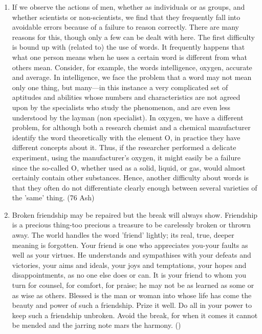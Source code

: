 \documentclass[12pt]{article}
\begin{document}
\begin{enumerate}
    \item If we observe the actions of men, whether as individuals or as groups, and whether scientists or non-scientists, we find that they frequently fall into avoidable errors because of a failure to reason correctly. There are many reasons for this, though only a few can be dealt with here.
      The first difficulty is bound up with (related to) the use of words. It frequently happens that what one person means when he uses a certain word is different from what others mean. Consider, for example, the words intelligence, oxygen, accurate and average. In intelligence, we face the problem that a word may not mean only one thing, but many—in this instance a very complicated set of aptitudes and abilities whose numbers and characteristics are not agreed upon by the specialists who study the phenomenon, and are even less understood by the layman (non specialist). In oxygen, we have a different problem, for although both a research chemist and a chemical manufacturer identify the word theoretically with the element O, in practice they have different concepts about it. Thus, if the researcher performed a delicate experiment, using the manufacturer's oxygen, it might easily be a failure since the so-called O, whether used as a solid, liquid, or gas, would almost certainly contain other substances. Hence, another difficulty about words is that they often do not differentiate clearly enough between several varieties of the 'same' thing. \hfill (76 Ash)

    \item Broken friendship may be repaired but the break will always show. Friendship is a precious thing-too precious a treasure to be carelessly broken or thrown away. The world handles the word 'friend' lightly; its real, true, deeper meaning is forgotten.
      Your friend is one who appreciates you-your faults as well as your virtues. He understands and sympathises with your defeats and victories, your aims and ideals, your joys and temptations, your hopes and disappointments, as no one else does or can. It is your friend to whom you turn for counsel, for comfort, for praise; he may not be as learned as some or as wise as others.
      Blessed is the man or woman into whose life has come the beauty and power of such a friendship. Prize it well. Do all in your power to keep such a friendship unbroken. Avoid the break, for when it comes it cannot be mended and the jarring note mars the harmony. \hfill ()
      

\end{enumerate}
\end{document}
